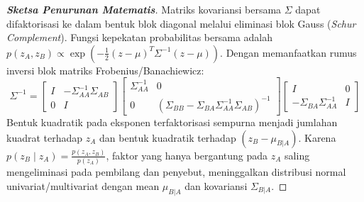 \documentclass[11pt,a4paper]{article}
\def\boldsymbol#1{#1}%
\def\mathbf#1{#1}%
\begin{document}
\begin{proof}[\textbf{Sketsa Penurunan Matematis}]
Matriks kovariansi bersama $\Sigma$ dapat difaktorisasi ke dalam bentuk blok diagonal melalui eliminasi blok Gauss (\textit{Schur Complement}). Fungsi kepekatan probabilitas bersama adalah $p(\mathbf{z}_A, \mathbf{z}_B) \propto \exp\left(-\frac{1}{2} (\mathbf{z} - \boldsymbol{\mu})^T \Sigma^{-1} (\mathbf{z} - \boldsymbol{\mu})\right)$. Dengan memanfaatkan rumus inversi blok matriks Frobenius/Banachiewicz:
\begin{equation}
\Sigma^{-1} = \begin{bmatrix} I & -\Sigma_{AA}^{-1} \Sigma_{AB} \\ 0 & I \end{bmatrix}
\begin{bmatrix} \Sigma_{AA}^{-1} & 0 \\ 0 & (\Sigma_{BB} - \Sigma_{BA}\Sigma_{AA}^{-1}\Sigma_{AB})^{-1} \end{bmatrix}
\begin{bmatrix} I & 0 \\ -\Sigma_{BA}\Sigma_{AA}^{-1} & I \end{bmatrix}
\end{equation}
Bentuk kuadratik pada eksponen terfaktorisasi sempurna menjadi jumlahan kuadrat terhadap $\mathbf{z}_A$ dan bentuk kuadratik terhadap $(\mathbf{z}_B - \boldsymbol{\mu}_{B|A})$. Karena $p(\mathbf{z}_B \mid \mathbf{z}_A) = \frac{p(\mathbf{z}_A, \mathbf{z}_B)}{p(\mathbf{z}_A)}$, faktor yang hanya bergantung pada $\mathbf{z}_A$ saling mengeliminasi pada pembilang dan penyebut, meninggalkan distribusi normal univariat/multivariat dengan mean $\boldsymbol{\mu}_{B|A}$ dan kovariansi $\Sigma_{B|A}$.
\end{proof}
\end{document}
